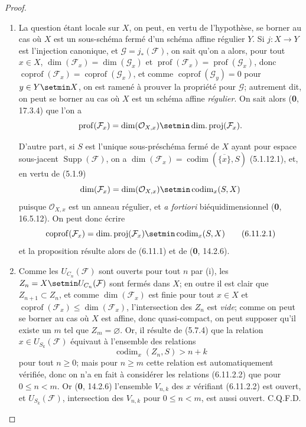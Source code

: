 \begin{proof}
\begin{enumerate}
\item[(i)] La question étant locale sur $X$, on peut, en vertu de
l'hypothèse, se borner au cas où $X$ est un sous-schéma fermé d'un schéma
affine régulier $Y$. Si $j:X\to Y$ est l'injection canonique, et
$\mathcal G=j_*(\mathcal F)$, on sait qu'on a alors, pour tout $x\in X$,
$\dim(\mathcal F_x)=\dim(\mathcal G_x)$ et
$\operatorname{prof}(\mathcal F_x)=\operatorname{prof}(\mathcal G_x)$,
donc $\operatorname{coprof}(\mathcal F_x)=
\operatorname{coprof}(\mathcal G_x)$, et comme
$\operatorname{coprof}(\mathcal G_y)=0$ pour $y\in Y\setmin X$, on est ramené à
prouver la propriété pour $\mathcal G$; autrement dit, on peut se borner au
cas où $X$ est un schéma affine \emph{régulier}. On sait alors (\textbf{0}, 17.3.4) que
l'on a
\[
\operatorname{prof}(\mathcal F_x)=\dim(\mathcal O_{X,x})\setmin
\operatorname{dim.proj}(\mathcal F_x).
\]

D'autre part, si $S$ est l'unique sous-préschéma fermé de $X$ ayant pour
espace sous-jacent $\operatorname{Supp}(\mathcal F)$, on a
$\dim(\mathcal F_x)=\operatorname{codim}(\overline{\{x\}},S)$ (5.1.12.1), et, en
vertu de (5.1.9)
\[
\dim(\mathcal F_x)=\dim(\mathcal O_{X,x})\setmin\operatorname{codim}_x(S,X)
\]
puisque $\mathcal O_{X,x}$ est un anneau régulier, et \emph{a fortiori}
biéquidimensionnel (\textbf{0}, 16.5.12). On peut donc écrire
\begin{equation}
\operatorname{coprof}(\mathcal F_x)=
\operatorname{dim.proj}(\mathcal F_x)\setmin\operatorname{codim}_x(S,X)
\tag{6.11.2.1}\label{IV.2.s6.11.2.1-fr}
\end{equation}
et la proposition résulte alors de (6.11.1) et de (\textbf{0}, 14.2.6).

\item[(ii)] Comme les $U_{C_n}(\mathcal F)$ sont ouverts pour tout $n$ par
(i), les $Z_n=X\setmin U_{C_n}(\mathcal F)$ sont fermés dans $X$; en outre il est
clair que $Z_{n+1}\subset Z_n$, et comme $\dim(\mathcal F_x)$ est finie
pour tout $x\in X$ et
$\operatorname{coprof}(\mathcal F_x)\leq\dim(\mathcal F_x)$,
l'intersection des $Z_n$ est \emph{vide}; comme on peut se borner au cas où $X$
est affine, donc quasi-compact, on peut supposer qu'il existe un $m$
tel que $Z_m=\varnothing$. Or, il résulte de (5.7.4) que la relation
$x\in U_{S_k}(\mathcal F)$ équivaut à l'ensemble des relations
\begin{equation}
\operatorname{codim}_x(Z_n,S)>n+k
\tag{6.11.2.2}\label{IV.2.s6.11.2.2-fr}
\end{equation}
pour tout $n\geq0$; mais pour $n\geq m$ cette relation est automatiquement
vérifiée, donc on n'a en fait à considérer les relations (6.11.2.2) que
pour $0\leq n<m$. Or (\textbf{0}, 14.2.6) l'ensemble $V_{n,k}$ des $x$ vérifiant
(6.11.2.2) est ouvert, et $U_{S_k}(\mathcal F)$, intersection des $V_{n,k}$
pour $0\leq n<m$, est aussi ouvert. C.Q.F.D.
\end{enumerate}
\end{proof}

